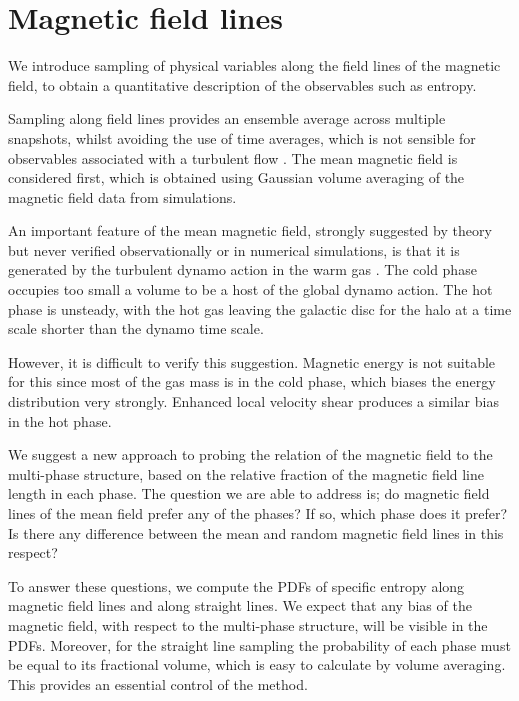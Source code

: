 \documentclass[useAMS,usenatbib]{mn2e}
\begin{document}
\section[]{Magnetic field lines}

We introduce sampling of physical variables along the field lines of the  magnetic field, to obtain a quantitative description of the observables such as entropy.

Sampling along field lines provides an ensemble average across multiple snapshots, whilst avoiding the use of time averages, which is not 
sensible for observables associated with a turbulent flow \citep{TL72}. 
The mean magnetic field is considered first, which is obtained using Gaussian volume averaging of the magnetic field data from simulations.  

An important feature of the mean magnetic field, strongly suggested by theory but never verified observationally or in numerical simulations, is that it is generated by the turbulent dynamo action in the warm gas \citep{S07}. The cold phase occupies too small a volume to be a host of the global dynamo action. The hot phase is unsteady, with the hot gas leaving the galactic disc for the halo at a time scale shorter than the dynamo time scale.

However, it is difficult to verify this suggestion. Magnetic energy is not suitable for this since most of the gas mass is in the cold phase, which biases the energy distribution very strongly. Enhanced local velocity shear produces a similar bias in the hot phase.

We suggest a new approach to probing the relation of the magnetic field to the multi-phase structure, based on the relative fraction of the magnetic field line length in each phase. The question we are able to address is; do magnetic field lines of the mean field prefer any of the phases? If so, which phase does it prefer? Is there any difference between the mean and random magnetic field lines in this respect?

To answer these questions, we compute the PDFs of specific entropy along magnetic field lines and along straight lines. We expect that any bias of the magnetic field, with respect to the multi-phase structure, will be visible in the PDFs. Moreover, for the straight line sampling the probability of each phase must be equal to its fractional volume, which is easy to calculate by volume averaging. This provides an essential control of the method.   
\end{document}
